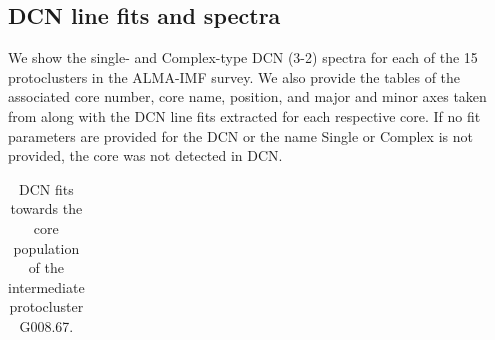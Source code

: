 \documentclass[longauth]{aa} %
\begin{document}
\begin{appendix}
\section{DCN line fits and spectra}
\label{appendix:spectral}
We show the single- and Complex-type DCN (3-2) spectra for each of the 15 protoclusters in the ALMA-IMF survey. We also provide the tables of the associated core number, core name, position, and major and minor axes taken from \citet{louvet22} along with the DCN line fits extracted for each respective core. If no fit parameters are provided for the DCN or the name Single or Complex is not provided, the core was not detected in DCN. 
\begin{table}[htp]
\centering
\small
\caption{DCN fits towards the core population of the intermediate protocluster G008.67.}
\label{g008coretables}
\begin{tabular}{llllllllccc}


\end{tabular}
\end{table}
\end{appendix}
\end{document}
